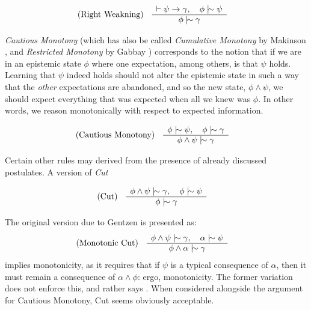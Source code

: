 \begin{align}
	\label{postulate:rw}\inferLeft{Right Weakning}{\vdash \psi \rightarrow \gamma, \quad \phi \twiddle \psi}{\phi \twiddle \gamma}
\end{align}

\textit{Cautious Monotony} (which has also be called \textit{Cumulative Monotony} by Makinson \cite{makinson2003bridges},
and \textit{Restricted Monotony} by Gabbay \cite{gabbay1985theoreticalFoundations}) corresponds to the notion that if we
are in an epistemic state $\phi$ where one expectation, among others, is that $\psi$ holds. Learning that $\psi$ indeed holds
should not alter the epistemic state in such a way that the \textit{other} expectations are abandoned, and so the new state,
$\phi \land \psi$, we should expect everything that was expected when all we knew was $\phi$. In other words, we reason monotonically
with respect to expected information.

\begin{align}
	\label{postulate:cm}\inferLeft{Cautious Monotony}{\phi \twiddle \psi, \quad \phi \twiddle \gamma }{\phi \land \psi \twiddle \gamma}
\end{align}

Certain other rules may derived from the presence of already discussed postulates. A version of \textit{Cut}

\begin{align}
	\label{postulate:cut}\inferLeft{Cut}{\phi \land \psi \twiddle \gamma, \quad \phi \twiddle \psi}{\phi \twiddle \gamma}
\end{align}

The original version due to Gentzen \cite{Ben1993Mathematical} is presented as:
\begin{align}
	\inferLeft{Monotonic Cut}{\phi \land \psi \twiddle \gamma, \quad \alpha \twiddle \psi}{\phi \land \alpha \twiddle \gamma}
\end{align}
implies monotonicity, as it requires that if $\psi$ is a typical consequence of $\alpha$, then it must remain a consequence
of $\alpha \land \phi$: ergo, monotonicity. The former variation does not enforce this, and rather says .
When considered alongside the argument for Cautious Monotony, Cut seems obviously acceptable.

